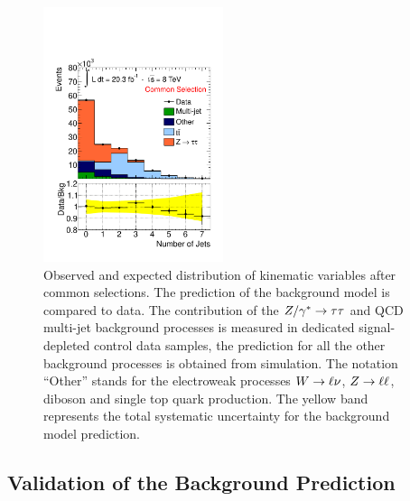 \begin{figure}[p]
\begin{center}
            \includegraphics[width=0.47\textwidth]{figure/final_plots/std_presel_nJet_tag.pdf}


    \end{center}
    \caption{ 
	Observed and expected distribution of  kinematic variables after common selections. 
	The prediction of the  background model is compared to  data.
	The contribution of the $Z/\gamma^*\rightarrow \tau\tau$ and QCD multi-jet background processes is measured in  dedicated  signal-depleted control data samples,
	the prediction for all the other background processes is obtained from simulation.
 	The notation ``Other'' stands 	for the electroweak processes $W\rightarrow \ell \nu$, $Z\rightarrow \ell \ell$, diboson and single top quark production.
	The yellow band represents the total systematic uncertainty for the background model prediction.}
   \label{fig:validation}
\end{figure}



\subsection{Validation of the \ttbar Background Prediction}
\label{sec:top_est}

